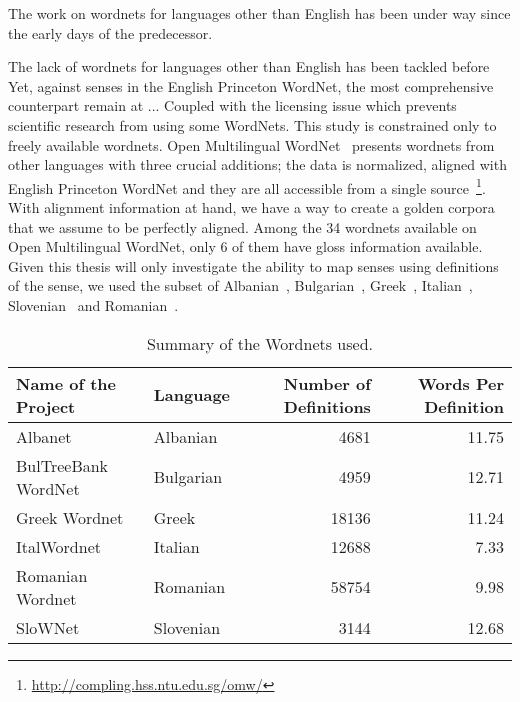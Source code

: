 The work on wordnets for languages other than English has been under way since the early days of the predecessor.

The lack of wordnets for languages other than English has been tackled before %
Yet, against %
senses in the English Princeton WordNet, the most comprehensive counterpart remain at ... %
Coupled with the licensing issue which prevents scientific research from using some WordNets.
This study is constrained only to freely available wordnets.
Open Multilingual WordNet~\cite{bond_survey_2012} presents wordnets from other languages with three crucial additions; %
the data is normalized, aligned with English Princeton WordNet and they are all accessible from a single source~\footnote{\url{http://compling.hss.ntu.edu.sg/omw/}}.
With alignment information at hand, we have a way to create a golden corpora that we assume to be perfectly aligned.
Among the 34 wordnets available on Open Multilingual WordNet, only 6 of them have gloss information available.
Given this thesis will only investigate the ability to map senses using definitions of the sense, we used the subset of Albanian~\cite{ruci_current_2008}, Bulgarian~\cite{simov_constructing_2010}, Greek~\cite{stamou_exploring_2004}, Italian~\cite{pianta_multiwordnet_2002}, Slovenian~\cite{fiser_slownet_2012} and Romanian~\cite{tufis_romanian_2008}.
\begin{table*}[!hbp]
    \begin{center}
        \caption{Summary of the Wordnets used.}\label{tab:summary_table}
        \begin{tabular}{llrr}
            \toprule%
            \textbf{Name of the Project} & \textbf{Language} & \textbf{Number of Definitions} & \textbf{Words Per Definition} \\
            \midrule%
            Albanet & Albanian & 4681 & 11.75 \\
            BulTreeBank WordNet & Bulgarian & 4959 & 12.71 \\
            Greek Wordnet & Greek & 18136 & 11.24 \\
            ItalWordnet & Italian & 12688 & 7.33 \\
            Romanian Wordnet & Romanian & 58754 & 9.98 \\
            SloWNet & Slovenian & 3144 & 12.68 \\
            \bottomrule %
        \end{tabular}
    \end{center}
\end{table*}

